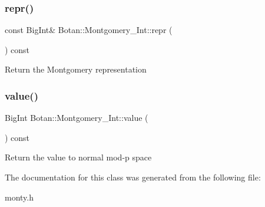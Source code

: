 \subsubsection{\texorpdfstring{repr()}{repr()}}
{\footnotesize\ttfamily const Big\+Int\& Botan\+::\+Montgomery\+\_\+\+Int\+::repr (\begin{DoxyParamCaption}{ }\end{DoxyParamCaption}) const\hspace{0.3cm}{\ttfamily [inline]}}

Return the Montgomery representation \mbox{\label{class_botan_1_1_montgomery___int_abc91331bc32dc00db87e8343f9839709}} 
\subsubsection{\texorpdfstring{value()}{value()}}
{\footnotesize\ttfamily Big\+Int Botan\+::\+Montgomery\+\_\+\+Int\+::value (\begin{DoxyParamCaption}{ }\end{DoxyParamCaption}) const}

Return the value to normal mod-\/p space 

The documentation for this class was generated from the following file\+:\begin{DoxyCompactItemize}
\item 
monty.\+h\end{DoxyCompactItemize}

